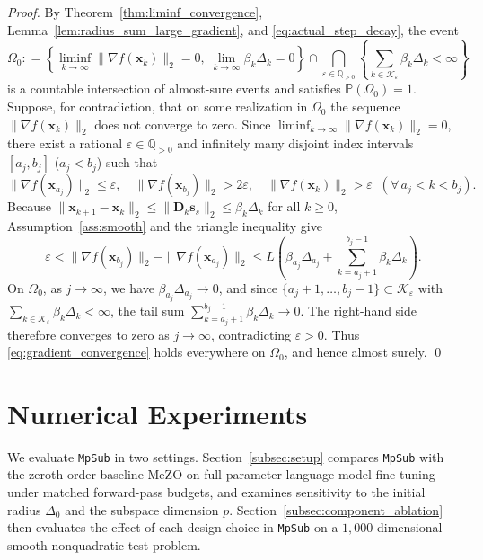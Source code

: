 \documentclass[smallextended]{svjour3}
\newcommand{\bx}{\bm{x}}
\newcommand{\bs}{\bm{s}}
\providecommand{\coloneqq}{\mathrel{\mathop:}=}
\begin{document}
\begin{proof}
By Theorem~\ref{thm:liminf_convergence}, Lemma~\ref{lem:radius_sum_large_gradient}, and \eqref{eq:actual_step_decay}, the event
\[
\Omega_0 \coloneqq \left\{ \liminf_{k\to\infty}\|\nabla f(\bx_k)\|_2 = 0,\; \lim_{k\to\infty}\beta_k\Delta_k = 0 \right\} \cap \bigcap_{\varepsilon \in \mathbb Q_{>0}} \left\{ \sum_{k\in\mathcal K_\varepsilon} \beta_k\Delta_k < \infty \right\}
\]
is a countable intersection of almost-sure events and satisfies $\mathbb P(\Omega_0) = 1$. Suppose, for contradiction, that on some realization in $\Omega_0$ the sequence $\|\nabla f(\bx_k)\|_2$ does not converge to zero. Since $\liminf_{k\to\infty}\|\nabla f(\bx_k)\|_2 = 0$, there exist a rational $\varepsilon \in \mathbb Q_{>0}$ and infinitely many disjoint index intervals $[a_j, b_j]$ ($a_j < b_j$) such that
\[
\|\nabla f(\bx_{a_j})\|_2 \le \varepsilon, \quad \|\nabla f(\bx_{b_j})\|_2 > 2\varepsilon, \quad \|\nabla f(\bx_k)\|_2 > \varepsilon \;\; (\forall\, a_j < k < b_j).
\]
Because $\|\bx_{k+1}-\bx_k\|_2 \le \|\bm D_k \bs_s\|_2 \le \beta_k\Delta_k$ for all $k\ge 0$, Assumption~\ref{ass:smooth} and the triangle inequality give
\[
\varepsilon < \|\nabla f(\bx_{b_j})\|_2 - \|\nabla f(\bx_{a_j})\|_2 \le L\left(\beta_{a_j}\Delta_{a_j} + \sum_{k=a_j+1}^{b_j-1} \beta_k\Delta_k\right).
\]
On $\Omega_0$, as $j\to\infty$, we have $\beta_{a_j}\Delta_{a_j} \to 0$, and since $\{a_j+1,\ldots,b_j-1\}\subset\mathcal K_\varepsilon$ with $\sum_{k\in\mathcal K_\varepsilon}\beta_k\Delta_k < \infty$, the tail sum $\sum_{k=a_j+1}^{b_j-1}\beta_k\Delta_k \to 0$. The right-hand side therefore converges to zero as $j\to\infty$, contradicting $\varepsilon > 0$. Thus \eqref{eq:gradient_convergence} holds everywhere on $\Omega_0$, and hence almost surely.
\qed
\end{proof}

\section{Numerical Experiments}
\label{sec:experiments}

We evaluate \texttt{MpSub} in two settings. Section~\ref{subsec:setup} compares \texttt{MpSub} with the zeroth-order baseline MeZO \cite{malladi2023mezo} on full-parameter language model fine-tuning under matched forward-pass budgets, and examines sensitivity to the initial radius $\Delta_0$ and the subspace dimension $p$. Section~\ref{subsec:component_ablation} then evaluates the effect of each design choice in \texttt{MpSub} on a $1{,}000$-dimensional smooth nonquadratic test problem.
\end{document}
